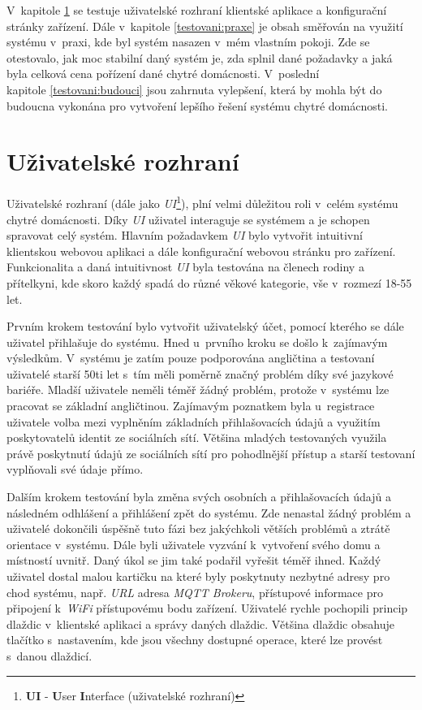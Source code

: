 V~kapitole \ref{testovani:UI} se testuje uživatelské rozhraní klientské aplikace a konfigurační stránky zařízení.
Dále v~kapitole \ref{testovani:praxe} je obsah směřován na využití systému v~praxi, kde byl systém nasazen v~mém vlastním pokoji.
Zde se otestovalo, jak moc stabilní daný systém je, zda splnil dané požadavky a jaká byla celková cena pořízení dané chytré domácnosti.
V~poslední \\ kapitole \ref{testovani:budouci} jsou zahrnuta vylepšení, která by mohla být do budoucna vykonána pro vytvoření lepšího řešení systému chytré domácnosti.

\section{Uživatelské rozhraní}
\label{testovani:UI}
Uživatelské rozhraní (dále jako \emph{UI}\footnote{\textbf{UI} - \textbf{U}ser \textbf{I}nterface (uživatelské rozhraní)}), plní velmi důležitou roli v~celém systému chytré domácnosti.
Díky \emph{UI} uživatel interaguje se systémem a je schopen spravovat celý systém.
Hlavním požadavkem \emph{UI} bylo vytvořit intuitivní klientskou webovou aplikaci a dále konfigurační webovou stránku pro zařízení.
Funkcionalita a daná intuitivnost \emph{UI} byla testována na členech rodiny a přítelkyni, kde skoro každý spadá do různé věkové kategorie, vše v~rozmezí 18-55 let.

Prvním krokem testování bylo vytvořit uživatelský účet, pomocí kterého se dále uživatel přihlašuje do systému.
Hned u~prvního kroku se došlo k~zajímavým výsledkům.
V~systému je zatím pouze podporována angličtina a testovaní uživatelé starší 50ti let s~tím měli poměrně značný problém díky své jazykové bariéře.
Mladší uživatele neměli téměř žádný problém, protože v~systému lze pracovat se základní angličtinou.
Zajímavým poznatkem byla u~registrace uživatele volba mezi vyplněním základních přihlašovacích údajů a využitím poskytovatelů identit ze sociálních sítí.
Většina mladých testovaných využila právě poskytnutí údajů ze sociálních sítí pro pohodlnější přístup a starší testovaní vyplňovali své údaje přímo.

Dalším krokem testování byla změna svých osobních a přihlašovacích údajů a následném odhlášení a přihlášení zpět do systému.
Zde nenastal žádný problém a uživatelé dokončili úspěšně tuto fázi bez jakýchkoli větších problémů a ztrátě orientace v~systému.
\newpage
Dále byli uživatele vyzvání k~vytvoření svého domu a místností uvnitř.
Daný úkol se jim také podařil vyřešit téměř ihned.
Každý uživatel dostal malou kartičku na které byly poskytnuty nezbytné adresy pro chod systému, např. \emph{URL} adresa \emph{MQTT Brokeru}, přístupové informace pro připojení k~\emph{WiFi} přístupovému bodu zařízení.
Uživatelé rychle pochopili princip dlaždic v~klientské aplikaci a správy daných dlaždic.
Většina dlaždic obsahuje tlačítko s~nastavením, kde jsou všechny dostupné operace, které lze provést s~danou dlaždicí.

